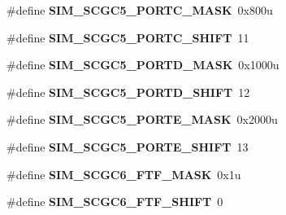 \begin{DoxyCompactItemize}
\item 
\hypertarget{group___s_i_m___register___masks_gaac31449d101ad0d05f2bed682571be35}{}\#define {\bfseries S\+I\+M\+\_\+\+S\+C\+G\+C5\+\_\+\+P\+O\+R\+T\+C\+\_\+\+M\+A\+S\+K}~0x800u\label{group___s_i_m___register___masks_gaac31449d101ad0d05f2bed682571be35}

\item 
\hypertarget{group___s_i_m___register___masks_gae141a6d4af583e7410d0120442b1012f}{}\#define {\bfseries S\+I\+M\+\_\+\+S\+C\+G\+C5\+\_\+\+P\+O\+R\+T\+C\+\_\+\+S\+H\+I\+F\+T}~11\label{group___s_i_m___register___masks_gae141a6d4af583e7410d0120442b1012f}

\item 
\hypertarget{group___s_i_m___register___masks_ga723a55222eb5f8fd25da5c956aa50e7b}{}\#define {\bfseries S\+I\+M\+\_\+\+S\+C\+G\+C5\+\_\+\+P\+O\+R\+T\+D\+\_\+\+M\+A\+S\+K}~0x1000u\label{group___s_i_m___register___masks_ga723a55222eb5f8fd25da5c956aa50e7b}

\item 
\hypertarget{group___s_i_m___register___masks_gad5f267781fcedf0fcdc0c4d3607c10cb}{}\#define {\bfseries S\+I\+M\+\_\+\+S\+C\+G\+C5\+\_\+\+P\+O\+R\+T\+D\+\_\+\+S\+H\+I\+F\+T}~12\label{group___s_i_m___register___masks_gad5f267781fcedf0fcdc0c4d3607c10cb}

\item 
\hypertarget{group___s_i_m___register___masks_ga3d5e3e51d345fe424a4f24aa9ae73dc1}{}\#define {\bfseries S\+I\+M\+\_\+\+S\+C\+G\+C5\+\_\+\+P\+O\+R\+T\+E\+\_\+\+M\+A\+S\+K}~0x2000u\label{group___s_i_m___register___masks_ga3d5e3e51d345fe424a4f24aa9ae73dc1}

\item 
\hypertarget{group___s_i_m___register___masks_gae717813cf38c35e5e4ea4243e939b4bc}{}\#define {\bfseries S\+I\+M\+\_\+\+S\+C\+G\+C5\+\_\+\+P\+O\+R\+T\+E\+\_\+\+S\+H\+I\+F\+T}~13\label{group___s_i_m___register___masks_gae717813cf38c35e5e4ea4243e939b4bc}

\item 
\hypertarget{group___s_i_m___register___masks_ga949452096cb8609fdb3503dda3f9f729}{}\#define {\bfseries S\+I\+M\+\_\+\+S\+C\+G\+C6\+\_\+\+F\+T\+F\+\_\+\+M\+A\+S\+K}~0x1u\label{group___s_i_m___register___masks_ga949452096cb8609fdb3503dda3f9f729}

\item 
\hypertarget{group___s_i_m___register___masks_gaf767cc087ed5983b84e79996586efb12}{}\#define {\bfseries S\+I\+M\+\_\+\+S\+C\+G\+C6\+\_\+\+F\+T\+F\+\_\+\+S\+H\+I\+F\+T}~0\label{group___s_i_m___register___masks_gaf767cc087ed5983b84e79996586efb12}


\end{DoxyCompactItemize}
